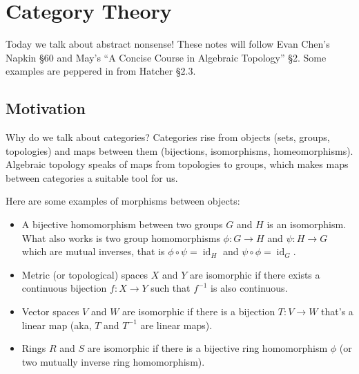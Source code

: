 \section{Category Theory}
Today we talk about abstract nonsense! These notes will follow Evan Chen's Napkin \S 60 and May's ``A Concise Course in Algebraic Topology'' \S 2. Some examples are peppered in from Hatcher \S 2.3.

\subsection{Motivation}
Why do we talk about categories? Categories rise from objects (sets, groups, topologies) and maps between them (bijections, isomorphisms, homeomorphisms). Algebraic topology speaks of maps from topologies to groups, which makes maps between categories a suitable tool for us.
\begin{example}
    Here are some examples of morphisms between objects:
    \begin{itemize}
        \item A bijective homomorphism between two groups $G$ and $H$ is an isomorphism. What also works is two group homomorphisms $\phi \colon G \to H$ and $\psi \colon H \to G$ which are mutual inverses, that is $\phi \circ \psi = \operatorname{id}_H$ and $\psi \circ \phi=\operatorname{id}_G$.
        \item Metric (or topological) spaces $X$ and  $Y$ are isomorphic if there exists a continuous bijection $f \colon  X \to Y$ such that $f^{-1}$ is also continuous.
        \item Vector spaces $V$ and $W$ are isomorphic if there is a bijection $T \colon V \to W$ that's a linear map (aka, $T$ and $T^{-1}$ are linear maps).
        \item Rings $R$ and $S$ are isomorphic if there is a bijective ring homomorphism $\phi$ (or two mutually inverse ring homomorphism).
    \end{itemize}
\end{example}

